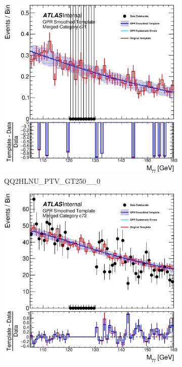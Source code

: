\begin{figure}
\begin{center}
\begin{subfigure}[T]{0.49\linewidth}
	\includegraphics[width=\linewidth]{figures/background/gpr/coupCatTemplates/GPR_Smoothed_Plot_hmgg_c71.eps}
	\caption{QQ2HLNU\_PTV\_GT250\_\_0}
\end{subfigure}
\begin{subfigure}[T]{0.49\linewidth}
	\centering
	\includegraphics[width=\linewidth]{figures/background/gpr/coupCatTemplates/GPR_Smoothed_Plot_hmgg_c72.eps}

\end{subfigure}
\end{center}
\end{figure}
